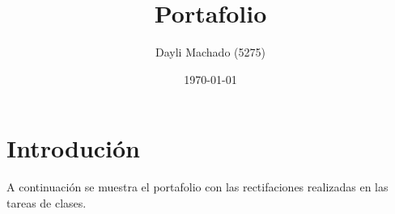 \documentclass{article}
\begin{document}
\title{Portafolio}
\author{Dayli Machado (5275)}
\date{\today}
\maketitle

\section{Introdución}

A continuación se muestra el portafolio con las rectifaciones realizadas en las tareas de clases.















\end{document}
